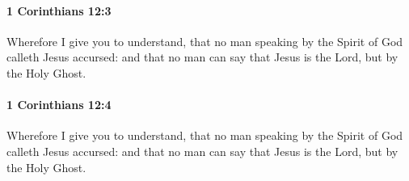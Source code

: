 		\paragraph{1 Corinthians 12:3} %
			\label{1CORINTHIANS-12-3}

			Wherefore I give you to understand, that no man speaking by the Spirit of God calleth Jesus accursed: and that no man can say that Jesus is the Lord, but by the Holy Ghost.

			\begin{framed}
				\scriptsize
				\begin{compactdesc}
					\item[SBLG] 
				\end{compactdesc}
			\end{framed}

		\paragraph{1 Corinthians 12:4} %
			\label{1CORINTHIANS-12-4}

			Wherefore I give you to understand, that no man speaking by the Spirit of God calleth Jesus accursed: and that no man can say that Jesus is the Lord, but by the Holy Ghost.

